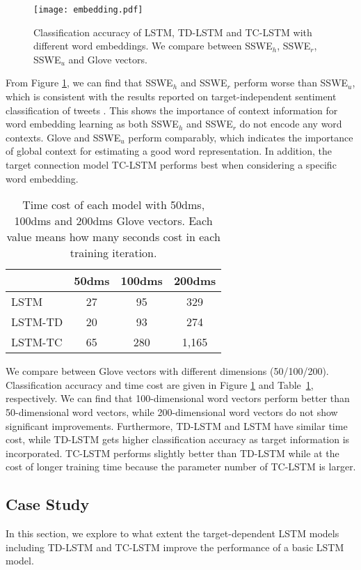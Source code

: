 \documentclass[11pt]{article}
\begin{document}
\begin{figure}[h]
	\centering
	\texttt{[image: embedding.pdf]}
	\caption{Classification accuracy of LSTM, TD-LSTM and TC-LSTM with different word embeddings. We compare between SSWE$_h$, SSWE$_r$, SSWE$_u$ and Glove vectors.}
	\label{fig:result-embedding}
\end{figure}
From Figure \ref{fig:result-embedding}, we can find that SSWE$_h$ and SSWE$_r$ perform worse than SSWE$_u$, which is consistent with the results reported on target-independent sentiment classification of tweets \cite{Tang2014}. This shows the importance of context information for word embedding learning as both  SSWE$_h$ and SSWE$_r$ do not encode any word contexts. 
Glove and SSWE$_u$ perform comparably, which indicates the importance of global context for estimating a good word representation. 
In addition, the target connection model TC-LSTM performs best when considering a specific word embedding.




\begin{table}[h]
	\centering
	\begin{tabular}{l|c|c|c}
		\hline
		& 50dms & 100dms & 200dms\\
		\hline
		LSTM	& 	27	&	95		&  329\\
		LSTM-TD	&	20	&	93		&  274\\
		LSTM-TC	&	65	&	280		&  1,165\\
		\hline		
	\end{tabular}
	\caption{Time cost of each model with 50dms, 100dms and 200dms Glove vectors. Each value means how many seconds cost in each training iteration.}
	\label{table:embedding-dms}
\end{table}
We  compare between Glove vectors with different dimensions (50/100/200). Classification accuracy and time cost are given in Figure \ref{fig:result-embedding} and Table~\ref{table:embedding-dms}, respectively.
We can find that 100-dimensional word vectors perform better than 50-dimensional word vectors, while 200-dimensional word vectors do not show significant improvements. 
Furthermore, TD-LSTM and LSTM have similar time cost, while TD-LSTM gets higher classification accuracy as target information is incorporated. 
TC-LSTM performs slightly better than TD-LSTM while at the cost of longer training time because the parameter number of TC-LSTM is larger. 


\subsection{Case Study}
In this section, we explore to what extent the target-dependent LSTM models including TD-LSTM and TC-LSTM improve the performance of a basic LSTM model.
\end{document}
